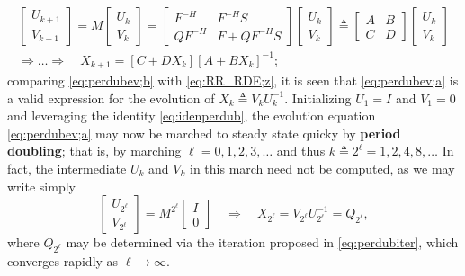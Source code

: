 \begin{subequations}
\label{eq:perdubev}
\begin{gather}
\begin{bmatrix} U_{k+1} \\ V_{k+1} \end{bmatrix} = M \begin{bmatrix} U_{k} \\ V_{k} \end{bmatrix}
   = \begin{bmatrix} F^{-H} & F^{-H}S \\ Q F^{-H} & F+ Q F^{-H}S \end{bmatrix} \begin{bmatrix} U_{k} \\ V_{k} \end{bmatrix}
   \triangleq \begin{bmatrix} A & B \\ C & D \end{bmatrix}\begin{bmatrix} U_{k} \\ V_{k} \end{bmatrix} \label{eq:perdubev;a} \\
\Rightarrow \ldots \Rightarrow \quad X_{k+1}=[C+D X_k][A+B X_k]^{-1}; \label{eq:perdubev;b}
\end{gather}
\end{subequations}
comparing \eqref{eq:perdubev;b} with \eqref{eq:RR_RDE;z}, it is seen that \eqref{eq:perdubev;a} is a valid expression for the evolution of $X_k \triangleq V_k U_k^{-1}$.  Initializing $U_1=I$ and $V_1=0$ and leveraging the identity \eqref{eq:idenperdub}, the
evolution equation \eqref{eq:perdubev;a} may now be marched to steady state quicky by {\bf period doubling}; that is,
by marching $\ell=0,1,2,3,\ldots$ and thus $k\triangleq 2^\ell=1,2,4,8,\ldots$
In fact, the intermediate $U_k$ and $V_k$ in this march need not be computed, as we may write simply
\begin{equation*}
\begin{bmatrix} U_{2^\ell} \\ V_{2^\ell} \end{bmatrix} = M^{2^\ell} \begin{bmatrix} I \\ 0 \end{bmatrix} \quad \Rightarrow \quad X_{2^\ell} = V_{2^\ell} U_{2^\ell}^{-1} = Q_{2^\ell},
\end{equation*}
where $Q_{2^\ell}$ may be determined via the iteration proposed in \eqref{eq:perdubiter}, which converges rapidly as $\ell \rightarrow \infty$.

